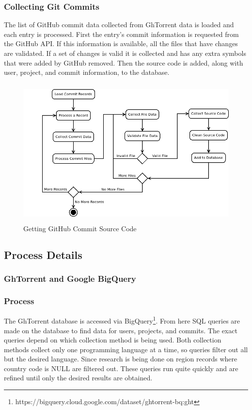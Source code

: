 \documentclass[12pt]{article}
\begin{document}
\subsubsection*{Collecting Git Commits}
The list of GitHub commit data collected from GhTorrent data is loaded and each entry is processed. First the entry's commit information is requested from the GitHub API. If this information is available, all the files that have changes are validated. If a set of changes is valid it is collected and has any extra symbols that were added by GitHub removed. Then the source code is added, along with user, project, and commit information, to the database.

\begin{figure}[t]
    \centering
    \includegraphics[height=7.5cm]{diagrams/commits.png}
    \caption{Getting GitHub Commit Source Code}
\end{figure}


\subsection{Process Details}

\subsubsection{GhTorrent and Google BigQuery}

\subsubsection*{Process}
The GhTorrent database is accessed via BigQuery\footnote{https://bigquery.cloud.google.com/dataset/ghtorrent-bq:ght}. From here SQL queries are made on the database to find data for users, projects, and commits. The exact queries depend on which collection method is being used. Both collection methods collect only one programming language at a time, so queries filter out all but the desired language. Since research is being done on region records where country code is NULL are filtered out. These queries run quite quickly and are refined until only the desired results are obtained.
\end{document}
